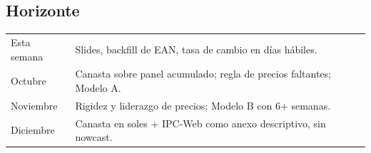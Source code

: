 \documentclass[11pt,a4paper]{article}
\begin{document}
\subsection*{Horizonte}
\begin{tabular}{ll}
\toprule
Esta semana & Slides, backfill de EAN, tasa de cambio en días hábiles. \\
Octubre & Canasta sobre panel acumulado; regla de precios faltantes; Modelo A. \\
Noviembre & Rigidez y liderazgo de precios; Modelo B con 6+ semanas. \\
Diciembre & Canasta en soles + IPC-Web como anexo descriptivo, sin nowcast. \\
\bottomrule
\end{tabular}
\end{document}
